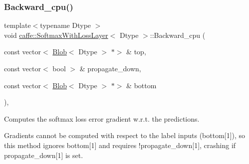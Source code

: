 \subsubsection{\texorpdfstring{Backward\+\_\+cpu()}{Backward\_cpu()}\hspace{0.1cm}{\footnotesize\ttfamily [1/2]}}
{\footnotesize\ttfamily template$<$typename Dtype $>$ \\
void \mbox{\hyperlink{classcaffe_1_1_softmax_with_loss_layer}{caffe\+::\+Softmax\+With\+Loss\+Layer}}$<$ Dtype $>$\+::Backward\+\_\+cpu (\begin{DoxyParamCaption}\item[{const vector$<$ \mbox{\hyperlink{classcaffe_1_1_blob}{Blob}}$<$ Dtype $>$ $\ast$$>$ \&}]{top,  }\item[{const vector$<$ bool $>$ \&}]{propagate\+\_\+down,  }\item[{const vector$<$ \mbox{\hyperlink{classcaffe_1_1_blob}{Blob}}$<$ Dtype $>$ $\ast$$>$ \&}]{bottom }\end{DoxyParamCaption})\hspace{0.3cm}{\ttfamily [protected]}, {\ttfamily [virtual]}}



Computes the softmax loss error gradient w.\+r.\+t. the predictions. 

Gradients cannot be computed with respect to the label inputs (bottom\mbox{[}1\mbox{]}), so this method ignores bottom\mbox{[}1\mbox{]} and requires !propagate\+\_\+down\mbox{[}1\mbox{]}, crashing if propagate\+\_\+down\mbox{[}1\mbox{]} is set.


